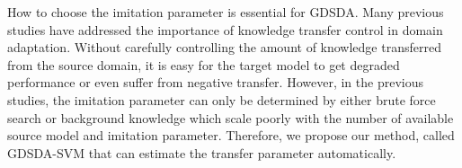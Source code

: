 How to choose the imitation parameter is essential for GDSDA.
Many previous studies have addressed the importance of knowledge transfer control in domain adaptation\cite{duan2012learning,duan2012visual}. Without carefully controlling the amount of knowledge transferred from the source domain, it is easy for the target model to get degraded performance or even suffer from negative transfer\cite{pan2010survey}. However, in the previous studies, the imitation parameter can only be determined by either brute force search\cite{lopez2015unifying} or background knowledge\cite{Tzeng_2015_ICCV} which scale poorly with the number of available source model and imitation parameter.
Therefore, we propose our method, called GDSDA-SVM that can estimate the transfer parameter automatically.



